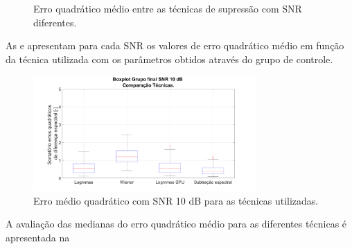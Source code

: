 \begin{figure}[H]
\quad
{}
\caption{Erro quadrático médio entre as técnicas de supressão com SNR diferentes.}
\label{aff2}
\end{figure}

As   e  apresentam para cada SNR os valores de erro quadrático médio em função da técnica utilizada com os parâmetros obtidos através do grupo de controle.

\begin{figure}[H]
\centering
\includegraphics[width=8.5cm]{Figs/Total_10a}
\caption{Erro médio quadrático com SNR 10 dB para as técnicas utilizadas.}
\label{total_m10}
\end{figure}

A avaliação das medianas do erro quadrático médio para as diferentes técnicas é apresentada na 

